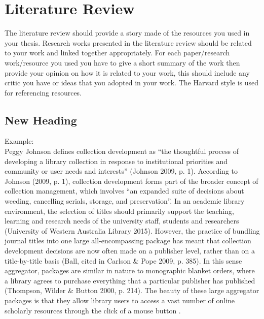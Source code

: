\chapter{Literature Review}

\begin{justify}
The literature review should provide a story made of the resources you used in your thesis. Research works presented in the literature review should be related to your work and linked together appropriately.  For each paper/research work/resource you used you have to give a short summary of the work then provide your opinion on how it is related to your work, this should include any critic you have or ideas that you adopted in your work.  The Harvard style is used for referencing resources.
\end{justify}

\section{New Heading}
\begin{justify}
Example: \\
Peggy Johnson defines collection development as “the thoughtful process of developing a library collection in response to institutional priorities and community or user needs and interests” (Johnson 2009, p. 1).  According to Johnson (2009, p. 1), collection development forms part of the broader concept of collection management, which involves “an expanded suite of decisions about weeding, cancelling serials, storage, and preservation”.  In an academic library environment, the selection of titles should primarily support the teaching, learning and research needs of the university staff, students and researchers (University of Western Australia Library 2015).  However, the practice of bundling journal titles into one large all-encompassing package has meant that collection development decisions are now often made on a publisher level, rather than on a title-by-title basis (Ball, cited in Carlson \& Pope 2009, p. 385).  In this sense aggregator, packages are similar in nature to monographic blanket orders, where a library agrees to purchase everything that a particular publisher has published (Thompson, Wilder \& Button 2000, p. 214).  The beauty of these large aggregator packages is that they allow library users to access a vast number of online scholarly resources through the click of a mouse button \cite{alvarez2002design}.
\end{justify}

\clearpage
